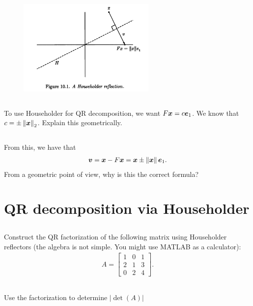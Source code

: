 \documentclass[11pt,letterpaper]{report}
\begin{document}
\begin{figure}[H]
    \centering
    \includegraphics[width = 0.6\textwidth]{Session_7/latex/figs/TB_HouseholderRef}
\end{figure}

\subsection{}
To use Householder for QR decomposition, we want $F\boldsymbol{x} = c\boldsymbol{e}_1$. We know that $c = \pm\left\Vert \boldsymbol{x} \right\Vert_2$. Explain this geometrically.

\subsection{}
From this, we have that
\begin{align*}
    \boldsymbol{v} = \boldsymbol{x}- F\boldsymbol{x} =  \boldsymbol{x} \pm \left\Vert \boldsymbol{x} \right\Vert\boldsymbol{e}_1.
\end{align*}
From a geometric point of view, why is this the correct formula?

\section{QR decomposition via Householder}
\subsection{}
Construct the QR factorization of the following matrix
  using Householder reflectors (the algebra is not simple. You might use MATLAB as a calculator):
\begin{align*}
{A} = 
\begin{bmatrix}
1 & 0 & 1 \\
2 & 1 & 3 \\
0 & 2 & 4
\end{bmatrix}.
\end{align*}
\subsection{}
Use the factorization to determine $|\det(A)|$
\end{document}
